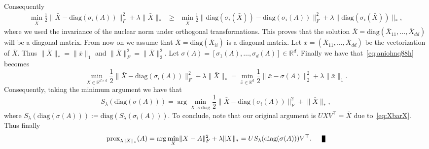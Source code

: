 \documentclass[11pt]{article}
\newcommand{\R}{\mathbb{R}}
\newcommand{\qed}{\nobreak \ifvmode \relax \else
      \ifdim\lastskip<1.5em \hskip-\lastskip
      \hskip1.5em plus0em minus0.5em \fi \nobreak
      \vrule height0.75em width0.5em depth0.25em\fi}
\newcommand{\norm}[1]{\lVert#1\rVert}
\begin{document}
\begin{ExerciseList}
\begin{eqnarray*}
\end{eqnarray*}
Consequently
 \begin{eqnarray*}
\min_{\bar{X}}\frac{1}{2}\norm{\bar{X}
-\mbox{diag}(\sigma_i(A))}_F^2 + \lambda\norm{\bar{X}}_*
& \geq & \min_{\bar{X}}\frac{1}{2}\norm{\mbox{diag}(\sigma_i(\bar{X}))
-\mbox{diag}(\sigma_i(A))}_F^2 + \lambda\norm{\mbox{diag}(\sigma_i(\bar{X}))}_*,
\end{eqnarray*} 
where we used the invariance of the nuclear norm under orthogonal transformations.
This proves that the solution $\bar{X} = \mbox{diag}(\bar{X}_{11}, \ldots, \bar{X}_{dd})$ will be a diagonal matrix. From now on we assume that $\bar{X}= \mbox{diag}(\bar{X}_{ii})$ is a diagonal matrix.  Let $\bar{x} = (\bar{X}_{11}, \ldots, \bar{X}_{dd})$ be the vectorization of $\bar{X}.$
Thus $\norm{\bar{X}}_* = \norm{\bar{x}}_1$ and $\norm{\bar{X}}_F^2 = \norm{\bar{X}}_2^2.$ Let $\sigma(A) = [\sigma_1(A),\ldots, \sigma_d(A)]\in \R^d.$
Finally we have that~\eqref{eq:aniohnq88h} becomes
\[ \min_{X \in \R^{d\times d}} \frac{1}{2}\norm{\bar{X}-\mbox{diag}(\sigma_i(A))}_F^2 + \lambda\norm{\bar{X}}_* =
\min_{\bar{x} \in \R^{d}} \frac{1}{2}\norm{\bar{x}-\sigma(A)}_2^2 + \lambda \norm{\bar{x}}_1.  \]     
Consequently, taking the minimum argument we have that 
\[S_{\lambda}(\mbox{diag}(\sigma(A))) =
 \arg\min_{\bar{X} \mbox{ is diag}} \frac{1}{2}\norm{\bar{X}-\mbox{diag}(\sigma_i(A))}_F^2 + \norm{\bar{X}}_*,\]
where $S_{\lambda}(\mbox{diag}(\sigma(A))) := \mbox{diag}(S_{\lambda}(\sigma_i(A))).$ To conclude, note that our original argument is $UXV^\top = \bar{X}$ due to~\eqref{eq:XbarX}. Thus finally
\[   \mbox{prox}_{\lambda \norm{X}_*} (A) =  \arg\min_X \norm{X-A}_F^2 + \lambda \norm{X}_* = 
US_{\lambda}(\mbox{diag}(\sigma(A)))V^\top.\qed  \]

\end{ExerciseList}
\printbibliography
\end{document}
